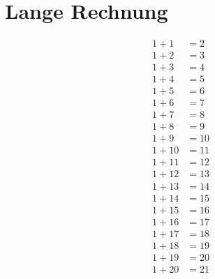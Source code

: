 \begingroup
\color{blue}
\section{Lange Rechnung}
\begin{align}%
    1+1&=2\\
    1+2&=3\\
    1+3&=4\\
    1+4&=5\\
    1+5&=6\\
    1+6&=7\\
    1+7&=8\\
    1+8&=9\\
    1+9&=10\\
    1+10&=11\\
    1+11&=12\\
    1+12&=13\\
    1+13&=14\\
    1+14&=15\\
    1+15&=16\\
    1+16&=17\\
    1+17&=18\\
    1+18&=19\\
    1+19&=20\\
    1+20&=21
\end{align}%

